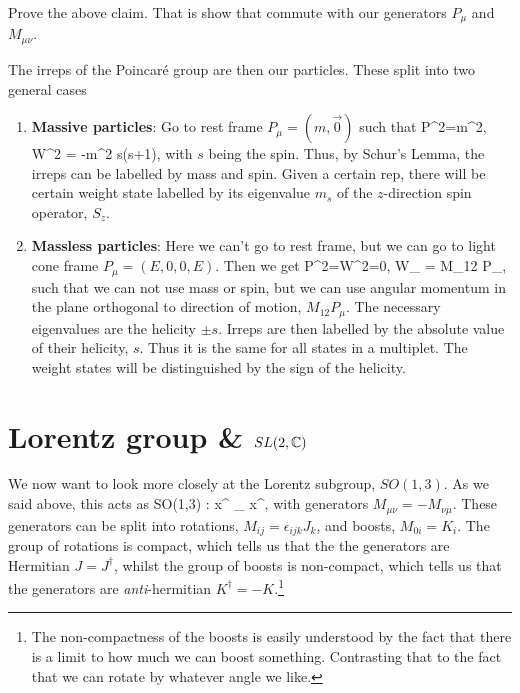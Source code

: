 \bbox 
    Prove the above claim. That is show that  commute with our generators $P_{\mu}$ and $M_{\mu\nu}$. 
\ebox 

The irreps of the Poincar\'{e} group are then our particles. These split into two general cases
\begin{enumerate}
    \item \textbf{Massive particles}: Go to rest frame $P_\mu = (m,\Vec{0})$ such that
    \bse 
    P^2=m^2, \qand W^2 = -m^2 s(s+1),
    \ese 
    with $s$ being the spin. Thus, by Schur's Lemma, the irreps can be labelled by mass and spin. Given a certain rep, there will be certain weight state labelled by its eigenvalue $m_s$ of the $z$-direction spin operator, $S_z$.
    \item \textbf{Massless particles}: Here we can't go to rest frame, but we can go to light cone frame $P_\mu = (E,0,0,E)$. Then we get
    \bse 
    P^2=W^2=0, \qand W_{\mu} = M_{12} P_{\mu},
    \ese 
    such that we can not use mass or spin, but we can use angular momentum in the plane orthogonal to direction of motion, $M_{12}P_{\mu}$. The necessary eigenvalues are the helicity $\pm s$. Irreps are then labelled by the absolute value of their helicity, $s$. Thus it is the same for all states in a multiplet. The weight states will be distinguished by the sign of the helicity.
\end{enumerate}

\section{Lorentz group \& $SL(2,\mathbb{C})$}

We now want to look more closely at the Lorentz subgroup, $SO(1,3)$. As we said above, this acts as
\be 
SO(1,3) :  x^{\mu} \mapsto {\Lambda^{\mu}}_{\nu} x^{\nu},
\ee 
with generators $M_{\mu\nu} = -M_{\nu\mu}$. These generators can be split into rotations, $M_{ij}=\epsilon_{ijk} J_k$, and boosts, $M_{0i}=K_i$. The group of rotations is compact, which tells us that the the generators are Hermitian $J=J^{\dagger}$, whilst the group of boosts is non-compact, which tells us that the generators are \textit{anti}-hermitian $K^\dagger=-K$.\footnote{The non-compactness of the boosts is easily understood by the fact that there is a limit to how much we can boost something. Contrasting that to the fact that we can rotate by whatever angle we like.}

